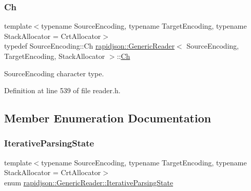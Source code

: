\subsubsection{\texorpdfstring{Ch}{Ch}}
{\footnotesize\ttfamily template$<$typename Source\+Encoding, typename Target\+Encoding, typename Stack\+Allocator = Crt\+Allocator$>$ \\
typedef Source\+Encoding\+::\+Ch \mbox{\hyperlink{classrapidjson_1_1_generic_reader}{rapidjson\+::\+Generic\+Reader}}$<$ Source\+Encoding, Target\+Encoding, Stack\+Allocator $>$\+::\mbox{\hyperlink{classrapidjson_1_1_generic_reader_a0781d19e8c6bc044d9cc5f5d3dde287e}{Ch}}}



Source\+Encoding character type. 



Definition at line 539 of file reader.\+h.



\subsection{Member Enumeration Documentation}
\mbox{\label{classrapidjson_1_1_generic_reader_a1fd8fb2f2f017d42c89a5e11cd074e1e}} 
\subsubsection{\texorpdfstring{IterativeParsingState}{IterativeParsingState}}
{\footnotesize\ttfamily template$<$typename Source\+Encoding, typename Target\+Encoding, typename Stack\+Allocator = Crt\+Allocator$>$ \\
enum \mbox{\hyperlink{classrapidjson_1_1_generic_reader_a1fd8fb2f2f017d42c89a5e11cd074e1e}{rapidjson\+::\+Generic\+Reader\+::\+Iterative\+Parsing\+State}}\hspace{0.3cm}{\ttfamily [private]}}

